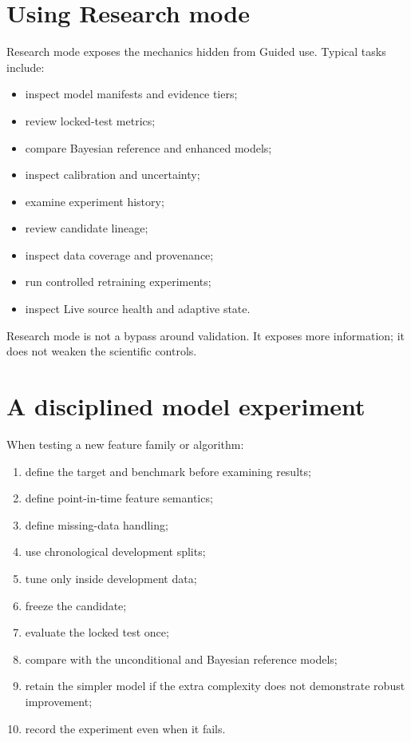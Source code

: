 \documentclass[11pt]{article}
\begin{document}
\section{Using Research mode}
Research mode exposes the mechanics hidden from Guided use. Typical tasks include:
\begin{itemize}[itemsep=0.15em]
\item inspect model manifests and evidence tiers;
\item review locked-test metrics;
\item compare Bayesian reference and enhanced models;
\item inspect calibration and uncertainty;
\item examine experiment history;
\item review candidate lineage;
\item inspect data coverage and provenance;
\item run controlled retraining experiments;
\item inspect Live source health and adaptive state.
\end{itemize}

Research mode is not a bypass around validation. It exposes more information; it does not weaken the scientific controls.

\section{A disciplined model experiment}
When testing a new feature family or algorithm:
\begin{enumerate}[itemsep=0.2em]
\item define the target and benchmark before examining results;
\item define point-in-time feature semantics;
\item define missing-data handling;
\item use chronological development splits;
\item tune only inside development data;
\item freeze the candidate;
\item evaluate the locked test once;
\item compare with the unconditional and Bayesian reference models;
\item retain the simpler model if the extra complexity does not demonstrate robust improvement;
\item record the experiment even when it fails.
\end{enumerate}
\end{document}
